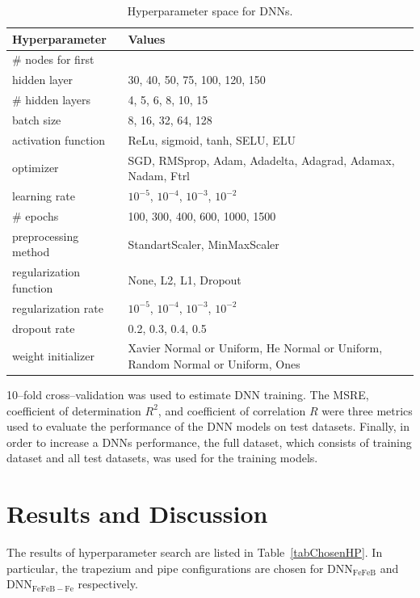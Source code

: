 \documentclass[a4paper,fleqn]{cas-sc}
\begin{document}
\begin{table}[width=\linewidth,cols=2,pos=h]
\caption{Hyperparameter space for DNNs.}\label{tabHP}
\begin{tabular*}{\tblwidth}{@{} LL@{} }
\toprule
Hyperparameter & Values\\
\midrule
\# nodes for first &\\
hidden layer & 30, 40, 50, 75, 100, 120, 150 \\
\# hidden layers & 4, 5, 6, 8, 10, 15 \\
 batch size & 8, 16, 32, 64, 128 \\
activation function & ReLu, sigmoid, tanh, SELU, ELU \\
optimizer & SGD, RMSprop, Adam, Adadelta, Adagrad, Adamax, Nadam, Ftrl \\
learning rate & $10^{-5}$, $10^{-4}$, $10^{-3}$, $10^{-2}$\\
\# epochs & 100, 300, 400, 600, 1000, 1500\\
preprocessing method & StandartScaler, MinMaxScaler \\
regularization function& None, L2, L1, Dropout\\
regularization rate & $10^{-5}$, $10^{-4}$, $10^{-3}$, $10^{-2}$\\
dropout rate & 0.2, 0.3, 0.4, 0.5 \\
weight initializer& Xavier Normal or Uniform, He Normal or Uniform, Random Normal or Uniform, Ones\\
\bottomrule
\end{tabular*}
\end{table}

10--fold cross--validation was used to estimate DNN training.
The MSRE, coefficient of determination $R^2$, and coefficient of correlation $R$ were
three metrics used to evaluate the performance of the DNN models on test datasets.
Finally, in order to increase a DNNs performance, the full dataset, which consists of training dataset and all test datasets,  was used for the training models.


\section{Results and Discussion}

The results of hyperparameter search are listed in Table~\ref{tabChosenHP}.
In particular, the trapezium and pipe configurations are chosen for DNN$_\mathrm{FeFeB}$ and DNN$_\mathrm{FeFeB-Fe}$ respectively.
\end{document}
